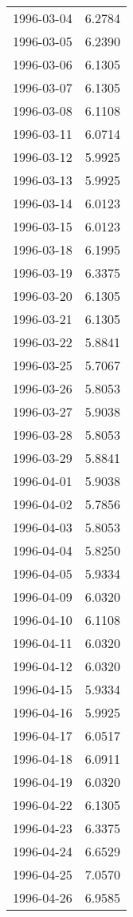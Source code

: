 \begin{tabular}{lr}
1996-03-04 &      6.2784 \\
1996-03-05 &      6.2390 \\
1996-03-06 &      6.1305 \\
1996-03-07 &      6.1305 \\
1996-03-08 &      6.1108 \\
1996-03-11 &      6.0714 \\
1996-03-12 &      5.9925 \\
1996-03-13 &      5.9925 \\
1996-03-14 &      6.0123 \\
1996-03-15 &      6.0123 \\
1996-03-18 &      6.1995 \\
1996-03-19 &      6.3375 \\
1996-03-20 &      6.1305 \\
1996-03-21 &      6.1305 \\
1996-03-22 &      5.8841 \\
1996-03-25 &      5.7067 \\
1996-03-26 &      5.8053 \\
1996-03-27 &      5.9038 \\
1996-03-28 &      5.8053 \\
1996-03-29 &      5.8841 \\
1996-04-01 &      5.9038 \\
1996-04-02 &      5.7856 \\
1996-04-03 &      5.8053 \\
1996-04-04 &      5.8250 \\
1996-04-05 &      5.9334 \\
1996-04-09 &      6.0320 \\
1996-04-10 &      6.1108 \\
1996-04-11 &      6.0320 \\
1996-04-12 &      6.0320 \\
1996-04-15 &      5.9334 \\
1996-04-16 &      5.9925 \\
1996-04-17 &      6.0517 \\
1996-04-18 &      6.0911 \\
1996-04-19 &      6.0320 \\
1996-04-22 &      6.1305 \\
1996-04-23 &      6.3375 \\
1996-04-24 &      6.6529 \\
1996-04-25 &      7.0570 \\
1996-04-26 &      6.9585 \\

\end{tabular}
